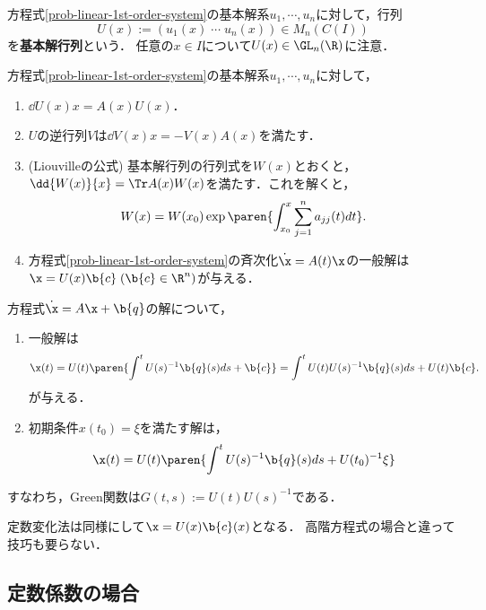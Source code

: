 \documentclass[uplatex,dvipdfmx]{jsreport}
\begin{document}
\begin{definition}
    方程式\ref{prob-linear-1st-order-system}の基本解系$u_1,\cdots,u_n$に対して，行列
    \[U(x):=(u_1(x)\;\cdots\;u_n(x))\in M_n(C(I))\]
    を\textbf{基本解行列}という．
    任意の$x\in I$について$U(x)\in \GL_n(\R)$に注意．
\end{definition}

\begin{proposition}[基本解行列による斉次化の解の表示]
    方程式\ref{prob-linear-1st-order-system}の基本解系$u_1,\cdots,u_n$に対して，
    \begin{enumerate}
        \item $\dd{U(x)}{x}=A(x)U(x)$．
        \item $U$の逆行列$V$は$\dd{V(x)}{x}=-V(x)A(x)$を満たす．
        \item (Liouvilleの公式) 基本解行列の行列式を$W(x)$とおくと，$\dd{W(x)}{x}=\Tr A(x)W(x)$を満たす．これを解くと，
        \[W(x)=W(x_0)\exp\paren{\int^x_{x_0}\sum_{j=1}^na_{jj}(t)dt}.\]
        \item 方程式\ref{prob-linear-1st-order-system}の斉次化$\dot{\x}=A(t)\x$の一般解は$\x=U(x)\b{c}\;(\b{c}\in\R^n)$が与える．
    \end{enumerate}
\end{proposition}

\begin{proposition}[非斉次方程式の解公式]
    方程式$\dot{\x}=A\x+\b{q}$の解について，
    \begin{enumerate}
        \item 一般解は\[\x(t)=U(t)\paren{\int^{t} U(s)^{-1}\b{q}(s)ds+\b{c}}=\int^tU(t)U(s)^{-1}\b{q}(s)ds+U(t)\b{c}.\]
        が与える．
        \item 初期条件$x(t_0)=\xi$を満たす解は，
        \[\x(t)=U(t)\paren{\int^{t} U(s)^{-1}\b{q}(s)ds+U(t_0)^{-1}\xi}\]
    \end{enumerate}
    すなわち，Green関数は$G(t,s):=U(t)U(s)^{-1}$である．

\end{proposition}
\begin{remarks}
    定数変化法は同様にして$\x=U(x)\b{c}(x)$となる．
    高階方程式の場合と違って技巧も要らない．
\end{remarks}

\subsection{定数係数の場合}
\end{document}

